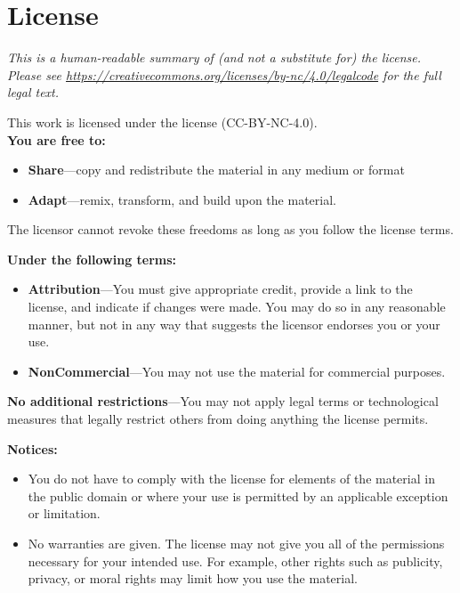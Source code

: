 \chapter{License}\label{s:license}

{\setlength{\parindent}{0em}

\emph{
  This is a human-readable summary of (and not a substitute for) the license.
  Please see \url{https://creativecommons.org/licenses/by-nc/4.0/legalcode} for the full legal text.
}

\vspace{\baselineskip}

\noindent
This work is licensed under the
 license
(CC-BY-NC-4.0).\\

\noindent
\textbf{You are free to:}

\begin{itemize}
\item
  \textbf{Share}---copy and redistribute the material in any medium or
  format
\item
  \textbf{Adapt}---remix, transform, and build upon the material.
\end{itemize}

The licensor cannot revoke these freedoms as long as you follow the
license terms.

\textbf{Under the following terms:}

\begin{itemize}
\item
  \textbf{Attribution}---You must give appropriate credit, provide a link
  to the license, and indicate if changes were made. You may do so in
  any reasonable manner, but not in any way that suggests the licensor
  endorses you or your use. \\
\item
  \textbf{NonCommercial}---You may not use the material for commercial purposes.
\end{itemize}

\textbf{No additional restrictions}---You may not apply legal terms or
technological measures that legally restrict others from doing anything the
license permits.

\vspace{\baselineskip}

\textbf{Notices:}

\begin{itemize}

\item
  You do not have to comply with the license for elements of the
  material in the public domain or where your use is permitted by an
  applicable exception or limitation.

\item
  No warranties are given. The license may not give you all of the
  permissions necessary for your intended use. For example, other rights
  such as publicity, privacy, or moral rights may limit how you use the
  material.

\end{itemize}
}
